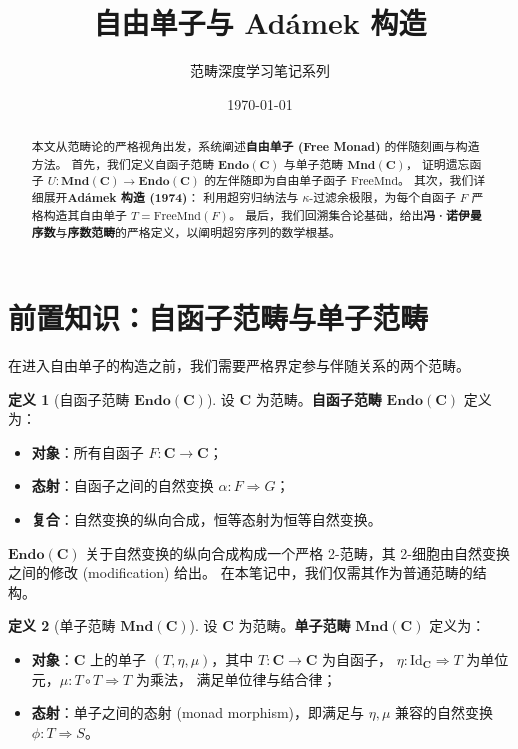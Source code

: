 \documentclass[UTF8,a4paper,12pt]{ctexart}
\theoremstyle{definition}
\newtheorem{definition}{定义}[section]
\theoremstyle{plain}
\theoremstyle{remark}
\newcommand{\cat}[1]{\mathbf{#1}}
\newcommand{\Id}{\mathrm{Id}}
\newcommand{\Endo}{\mathbf{Endo}}
\newcommand{\Mnd}{\mathbf{Mnd}}
\newcommand{\FreeMnd}{\mathrm{FreeMnd}}
\begin{document}
\title{\heiti 自由单子与 Adámek 构造}
\author{\kaishu 范畴深度学习笔记系列}
\date{\today}
\maketitle

\begin{abstract}
本文从范畴论的严格视角出发，系统阐述\textbf{自由单子 (Free Monad)} 的伴随刻画与构造方法。
首先，我们定义自函子范畴 $\Endo(\cat{C})$ 与单子范畴 $\Mnd(\cat{C})$，
证明遗忘函子 $U: \Mnd(\cat{C}) \to \Endo(\cat{C})$ 的左伴随即为自由单子函子 $\FreeMnd$。
其次，我们详细展开\textbf{Adámek 构造 (1974)}：
利用超穷归纳法与 $\kappa$-过滤余极限，为每个自函子 $F$ 严格构造其自由单子 $T = \FreeMnd(F)$。
最后，我们回溯集合论基础，给出\textbf{冯·诺伊曼序数}与\textbf{序数范畴}的严格定义，以阐明超穷序列的数学根基。
\end{abstract}

\tableofcontents
\newpage

\section{前置知识：自函子范畴与单子范畴}

在进入自由单子的构造之前，我们需要严格界定参与伴随关系的两个范畴。

\begin{definition}[自函子范畴 $\Endo(\cat{C})$]
设 $\cat{C}$ 为范畴。\textbf{自函子范畴} $\Endo(\cat{C})$ 定义为：
\begin{itemize}
    \item \textbf{对象}：所有自函子 $F: \cat{C} \to \cat{C}$；
    \item \textbf{态射}：自函子之间的自然变换 $\alpha: F \Rightarrow G$；
    \item \textbf{复合}：自然变换的纵向合成，恒等态射为恒等自然变换。
\end{itemize}
$\Endo(\cat{C})$ 关于自然变换的纵向合成构成一个严格 2-范畴，其 2-细胞由自然变换之间的修改 (modification) 给出。
在本笔记中，我们仅需其作为普通范畴的结构。
\end{definition}

\begin{definition}[单子范畴 $\Mnd(\cat{C})$]
设 $\cat{C}$ 为范畴。\textbf{单子范畴} $\Mnd(\cat{C})$ 定义为：
\begin{itemize}
    \item \textbf{对象}：$\cat{C}$ 上的单子 $(T, \eta, \mu)$，其中 $T: \cat{C} \to \cat{C}$ 为自函子，
          $\eta: \Id_{\cat{C}} \Rightarrow T$ 为单位元，$\mu: T \circ T \Rightarrow T$ 为乘法，
          满足单位律与结合律；
    \item \textbf{态射}：单子之间的态射 (monad morphism)，即满足与 $\eta, \mu$ 兼容的自然变换 $\phi: T \Rightarrow S$。
\end{itemize}
\end{definition}
\end{document}
